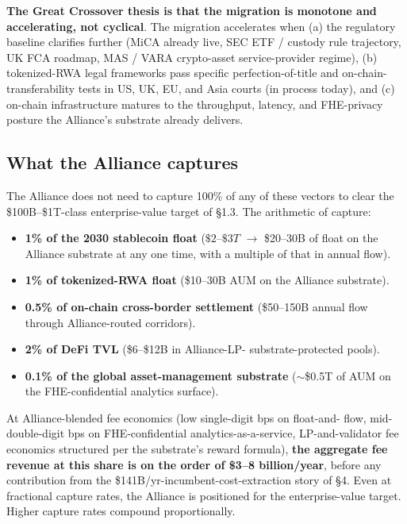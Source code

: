 \textbf{The Great Crossover thesis is that the migration is monotone
and accelerating, not cyclical}. The migration accelerates when (a) the
regulatory baseline clarifies further (MiCA already live, SEC ETF /
custody rule trajectory, UK FCA roadmap, MAS / VARA crypto-asset
service-provider regime), (b) tokenized-RWA legal frameworks pass
specific perfection-of-title and on-chain-transferability tests in
US, UK, EU, and Asia courts (in process today), and (c) on-chain
infrastructure matures to the throughput, latency, and FHE-privacy
posture the Alliance's substrate already delivers.

\subsection{What the Alliance captures}

The Alliance does not need to capture 100\% of any of these vectors to
clear the \$100B--\$1T-class enterprise-value target of \S 1.3. The
arithmetic of capture:

\begin{itemize}[leftmargin=2em,itemsep=0.1em]
\item \textbf{1\% of the 2030 stablecoin float} ($\$2$--$\$3T$
$\rightarrow$ \$20--30B of float on the Alliance substrate at any one
time, with a multiple of that in annual flow).
\item \textbf{1\% of tokenized-RWA float} (\$10--30B AUM on the
Alliance substrate).
\item \textbf{0.5\% of on-chain cross-border settlement} (\$50--150B
annual flow through Alliance-routed corridors).
\item \textbf{2\% of DeFi TVL} (\$6--\$12B in Alliance-LP-
substrate-protected pools).
\item \textbf{0.1\% of the global asset-management substrate}
($\sim$\$0.5T of AUM on the FHE-confidential analytics surface).
\end{itemize}

At Alliance-blended fee economics (low single-digit bps on float-and-
flow, mid-double-digit bps on FHE-confidential analytics-as-a-service,
LP-and-validator fee economics structured per the substrate's reward
formula), \textbf{the aggregate fee revenue at this share is on the
order of \$3--8 billion/year}, before any contribution from the
\$141B/yr-incumbent-cost-extraction story of \S 4. Even at fractional
capture rates, the Alliance is positioned for the enterprise-value
target. Higher capture rates compound proportionally.
